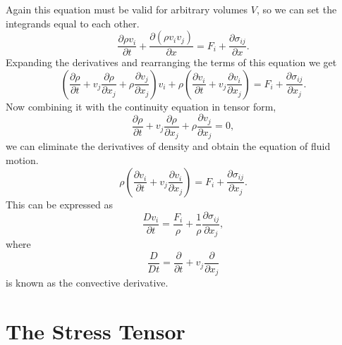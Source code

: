 \documentclass[12pt, letter]{report}
\begin{document}
Again this equation must be valid for arbitrary volumes $V$, so we can set the integrands equal to each other.
\begin{equation}
\frac{\partial \rho v_i}{\partial t} + \frac{\partial (\rho v_i v_j)}{\partial x} = F_i + \frac{\partial \sigma_{ij}}{\partial x}.
\end{equation}
Expanding the derivatives and rearranging the terms of this equation we get
\begin{equation}
\left( \frac{\partial \rho}{\partial t} + v_j \frac{\partial \rho}{\partial x_j} + \rho \frac{\partial v_j}{\partial x_j} \right) v_i + \rho \left( \frac{\partial v_i}{\partial t} + v_j \frac{\partial v_i}{\partial x_j} \right) = F_i + \frac{\partial \sigma_{ij}}{\partial x_j}.
\end{equation}
Now combining it with the continuity equation in tensor form,
\begin{equation}
\frac{\partial \rho}{\partial t} + v_j \frac{\partial \rho}{\partial x_j} + \rho \frac{\partial v_j}{\partial x_j} = 0,
\end{equation}
we can eliminate the derivatives of density and obtain the equation of fluid motion.
\begin{equation}
\rho \left( \frac{\partial v_i}{\partial t} + v_j \frac{\partial v_i}{\partial x_j} \right) = F_i + \frac{\partial \sigma_{ij}}{\partial x_j}.
\end{equation}
This can be expressed as
\begin{equation} 
\frac{D v_i}{\partial t} = \frac{F_i}{\rho} + \frac{1}{\rho}\frac{\partial \sigma_{ij}}{\partial x_j},
\end{equation}
where 
\begin{equation}
\frac{D}{Dt} = \frac{\partial }{\partial t} + v_j \frac{\partial }{\partial x_j}
\end{equation}
is known as the convective derivative. 

\section{The Stress Tensor}
\end{document}
